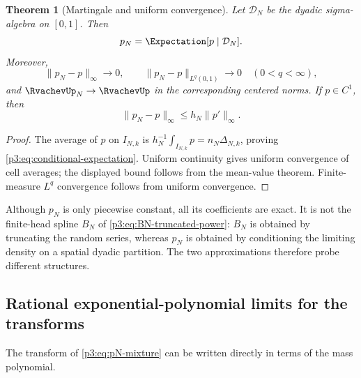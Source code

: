 \documentclass[11pt]{article}
\newtheorem{theorem}{Theorem}[section]
\theoremstyle{definition}
\theoremstyle{remark}
\begin{document}
\begin{theorem}[Martingale and uniform convergence]
\label{p3:thm:martingale-convergence}
Let $\mathcal D_N$ be the dyadic sigma-algebra on $[0,1]$.  Then
\begin{equation}\label{p3:eq:conditional-expectation}
 p_N=\Expectation[p\mid\mathcal D_N].
\end{equation}
Moreover,
\begin{equation}\label{p3:eq:pN-uniform}
 \|p_N-p\|_\infty\longrightarrow0,
 \qquad
 \|p_N-p\|_{L^q(0,1)}\longrightarrow0
 \quad(0<q<\infty),
\end{equation}
and $\RvachevUp_N\to\RvachevUp$ in the corresponding centered norms.
If $p\in C^1$, then
\begin{equation}\label{p3:eq:pN-simple-rate}
 \|p_N-p\|_\infty\le h_N\|p'\|_\infty.
\end{equation}
\end{theorem}

\begin{proof}
The average of $p$ on $I_{N,k}$ is
$h_N^{-1}\int_{I_{N,k}}p=n_N\Delta_{N,k}$, proving
\eqref{p3:eq:conditional-expectation}.  Uniform continuity gives uniform
convergence of cell averages; the displayed bound follows from the mean-value
theorem.  Finite-measure $L^q$ convergence follows from uniform convergence.
\end{proof}

\begin{remark}
Although $p_N$ is only piecewise constant, all its coefficients are exact.  It
is not the finite-head spline $B_N$ of \eqref{p3:eq:BN-truncated-power}: $B_N$ is
obtained by truncating the random series, whereas $p_N$ is obtained by
conditioning the limiting density on a spatial dyadic partition.  The two
approximations therefore probe different structures.
\end{remark}

\subsection{Rational exponential-polynomial limits for the transforms}

The transform of \eqref{p3:eq:pN-mixture} can be written directly in terms of the
mass polynomial.
\end{document}
